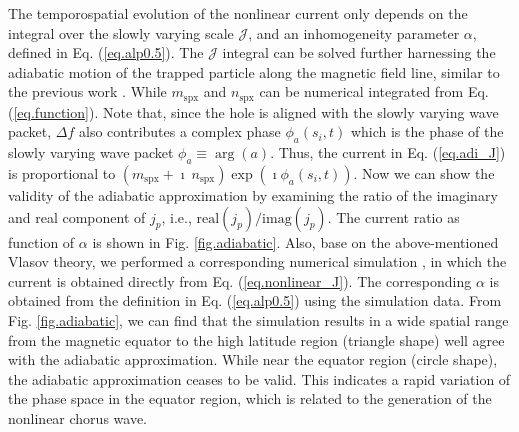 The temporospatial evolution of the nonlinear current only depends on the integral over the slowly varying scale $\mathcal{J}$, and an inhomogeneity parameter $\alpha$, defined in Eq. (\ref{eq.alp0.5}). 
The $\mathcal{J}$ integral can be solved further harnessing the adiabatic motion of the trapped particle along the magnetic field line, similar to the previous work \cite{summers2012}. While $m_\mathrm{spx}$ and $n_\mathrm{spx}$ can be numerical integrated from Eq. (\ref{eq.function}).
Note that, since the hole is aligned with the slowly varying wave packet,  $\Delta f$ also contributes a complex phase $\phi_a(s_i,t)$ which is the phase of the slowly varying wave packet $\phi_a \equiv \arg(a)$.
Thus, the current in Eq. (\ref{eq.adi_J}) is proportional to $(m_\mathrm{s p x}+\imath ~ n_\mathrm{s p x}) \exp({\imath \phi_a(s_i,t)})$.
Now we can show the validity of the adiabatic approximation by examining the ratio of the imaginary and real component of $j_p$, i.e., $\mathrm{real}(j_p)/\mathrm{imag}(j_p)$.
The current ratio as function of $\alpha$ is shown in Fig. \ref{fig.adiabatic}.
Also, base on the above-mentioned Vlasov theory, we performed a corresponding numerical simulation \cite{zheng2023b}, in which the current is obtained directly from Eq. (\ref{eq.nonlinear_J}).
The corresponding $\alpha$ is obtained from the definition in Eq. (\ref{eq.alp0.5}) using the simulation data.
From Fig. \ref{fig.adiabatic}, we can find that the simulation results in a wide spatial range from the magnetic equator to the high latitude region (triangle shape) well agree with the adiabatic approximation.
While near the equator region (circle shape), the adiabatic approximation ceases to be valid. 
This indicates a rapid variation of the phase space in the equator region, which is related to the generation of the nonlinear chorus wave.
